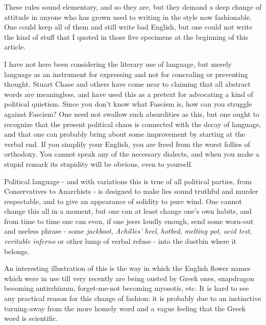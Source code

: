 These rules sound elementary, and so they are, but they demand a deep change of attitude in anyone who has grown used to writing in the style now fashionable. One could keep all of them and still write bad English, but one could not write the kind of stuff that I quoted in those five specimens at the beginning of this article.\par

I have not here been considering the literary use of language, but merely language as an instrument for expressing and not for concealing or preventing thought. Stuart Chase and others have come near to claiming that all abstract words are meaningless, and have used this as a pretext for advocating a kind of political quietism. Since you don’t know what Fascism is, how can you struggle against Fascism? One need not swallow such absurdities as this, but one ought to recognize that the present political chaos is connected with the decay of language, and that one can probably bring about some improvement by starting at the verbal end. If you simplify your English, you are freed from the worst follies of orthodoxy. You cannot speak any of the necessary dialects, and when you make a stupid remark its stupidity will be obvious, even to yourself.\par

Political language - and with variations this is true of all political parties, from Conservatives to Anarchists - is designed to make lies sound truthful and murder respectable, and to give an appearance of solidity to pure wind. One cannot change this all in a moment, but one can at least change one’s own habits, and from time to time one can even, if one jeers loudly enough, send some worn-out and useless phrase - some \textit{jackboot}, \textit{Achilles’ heel}, \textit{hotbed}, \textit{melting pot}, \textit{acid test}, \textit{veritable inferno} or other lump of verbal refuse - into the dustbin where it belongs.\par

\begin{readnote}
[1] An interesting illustration of this is the way in which the English flower names which were in use till very recently are being ousted by Greek ones, snapdragon becoming antirrhinum, forget-me-not becoming myosotis, etc. It is hard to see any practical reason for this change of fashion: it is probably due to an instinctive turning-away from the more homely word and a vague feeling that the Greek word is scientific.
\end{readnote}

